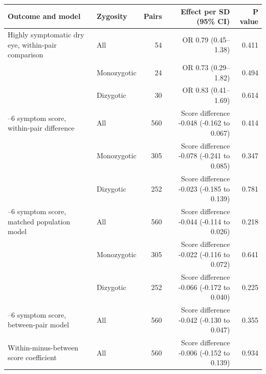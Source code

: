 \begin{tabular}{>{\raggedright\arraybackslash}p{}lrrr}
\toprule
Outcome and model & Zygosity & Pairs & Effect per SD (95\% CI) & P value \\
\midrule
Highly symptomatic dry eye, within-pair comparison & All & 54 & OR 0.79 (0.45--1.38) & 0.411 \\
 & Monozygotic & 24 & OR 0.73 (0.29--1.82) & 0.494 \\
 & Dizygotic & 30 & OR 0.83 (0.41--1.69) & 0.614 \\
0--6 symptom score, within-pair difference & All & 560 & Score difference -0.048 (-0.162 to 0.067) & 0.414 \\
 & Monozygotic & 305 & Score difference -0.078 (-0.241 to 0.085) & 0.347 \\
 & Dizygotic & 252 & Score difference -0.023 (-0.185 to 0.139) & 0.781 \\
0--6 symptom score, matched population model & All & 560 & Score difference -0.044 (-0.114 to 0.026) & 0.218 \\
 & Monozygotic & 305 & Score difference -0.022 (-0.116 to 0.072) & 0.641 \\
 & Dizygotic & 252 & Score difference -0.066 (-0.172 to 0.040) & 0.225 \\
0--6 symptom score, between-pair model & All & 560 & Score difference -0.042 (-0.130 to 0.047) & 0.355 \\
Within-minus-between score coefficient & All & 560 & Score difference -0.006 (-0.152 to 0.139) & 0.934 \\
\bottomrule
\end{tabular}
